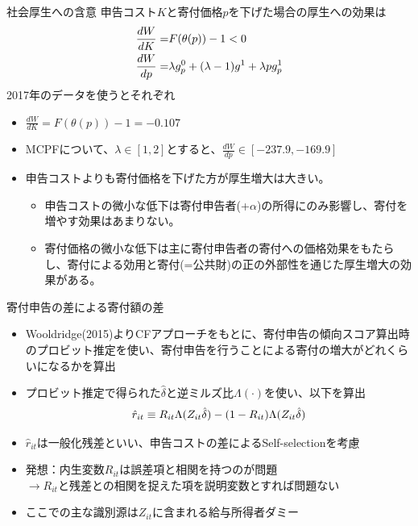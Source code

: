 \documentclass[dvipdfmx,10pt]{beamer}
\begin{document}
\begin{frame}{社会厚生への含意}
	申告コスト$K$と寄付価格$p$を下げた場合の厚生への効果は
	\begin{align}
		\frac{dW}{dK}=&F(\theta(p))-1<0\notag\\
		\frac{dW}{dp}=&\lambda g_p^0+(\lambda-1)g^1+\lambda pg_p^1\notag
	\end{align}2017年のデータを使うとそれぞれ
	\begin{itemize}
		\item $\frac{dW}{dK}=F(\theta(p))-1=-0.107$
		\item MCPFについて、$\lambda\in[1,2]$とすると、$\frac{dW}{dp}\in[-237.9, -169.9]$
		\item 申告コストよりも寄付価格を下げた方が厚生増大は大きい。
		\begin{itemize}
			\item 申告コストの微小な低下は寄付申告者(+$\alpha$)の所得にのみ影響し、寄付を増やす効果はあまりない。
			\item 寄付価格の微小な低下は主に寄付申告者の寄付への価格効果をもたらし、寄付による効用と寄付(=公共財)の正の外部性を通じた厚生増大の効果がある。
		\end{itemize}
	\end{itemize}
\end{frame}


\begin{frame}{寄付申告の差による寄付額の差}
	\begin{itemize}
		\item Wooldridge(2015)よりCFアプローチをもとに、寄付申告の傾向スコア算出時のプロビット推定を使い、寄付申告を行うことによる寄付の増大がどれくらいになるかを算出
		\item プロビット推定で得られた$\hat{\delta}$と逆ミルズ比$\Lambda(\cdot)$を使い、以下を算出
		\begin{align}
			\hat{r}_{it}\equiv R_{it}\Lambda(Z_{it}\hat{\delta})-(1-R_{it})\Lambda(Z_{it}\hat{\delta})\notag
		\end{align}
		\item $\hat{r}_{it}$は一般化残差といい、申告コストの差によるSelf-selectionを考慮
		\item 発想：内生変数$R_{it}$は誤差項と相関を持つのが問題\\
		\qquad$\to$$R_{it}$と残差との相関を捉えた項を説明変数とすれば問題ない
		\item ここでの主な識別源は$Z_{it}$に含まれる給与所得者ダミー
	\end{itemize}
\end{frame}
\end{document}
